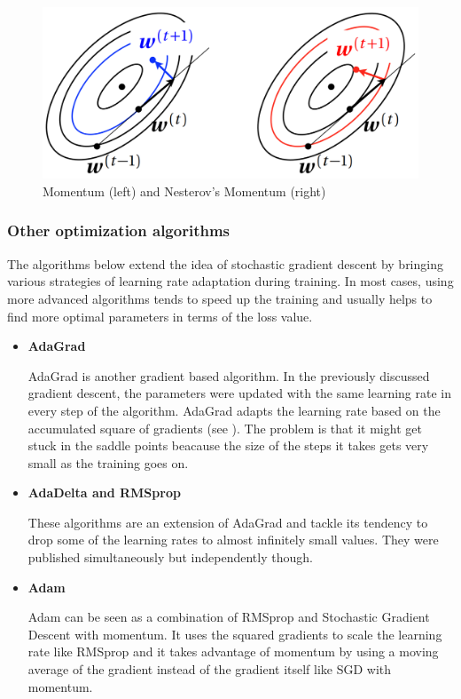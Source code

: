 \vspace{4mm}
\begin{figure}[htb]
	\begin{center}
		\includegraphics*[width=12cm, keepaspectratio]{obr/momentum.png}
	\end{center}
	\vspace{4mm}
	\caption{Momentum (left) and Nesterov's Momentum (right) \cite{mehlig}} 
	\label{momentum}
\end{figure}

\newpage
\subsubsection{Other optimization algorithms}

The algorithms below extend the idea of stochastic gradient descent by bringing various strategies of learning rate adaptation during training. In most cases, using more advanced algorithms tends to speed up the training and usually helps to find more optimal parameters in terms of the loss value. 

\begin{itemize}
	\item \textbf{AdaGrad}
	
	AdaGrad is another gradient based algorithm. In the previously discussed gradient descent, the parameters were updated with the same learning rate in every step of the algorithm. AdaGrad adapts the learning rate based on the accumulated square of gradients (see \cite{stanford-L7}). The problem is that it might get stuck in the saddle points beacause the size of the steps it takes gets very small as the training goes on. \cite{stanford-L7}
	
	\item \textbf{AdaDelta and RMSprop}
	
	These algorithms are an extension of AdaGrad and tackle its tendency to drop some of the learning rates to almost infinitely small values. They were published simultaneously but independently though. \cite{groman}
	
	\item \textbf{Adam}
	
	Adam can be seen as a combination of RMSprop and Stochastic Gradient Descent with momentum. It uses the squared gradients to scale the learning rate like RMSprop and it takes advantage of momentum by using a moving average of the gradient instead of the gradient itself like SGD with momentum. \cite{bushaev} \cite{groman}

\end{itemize}

